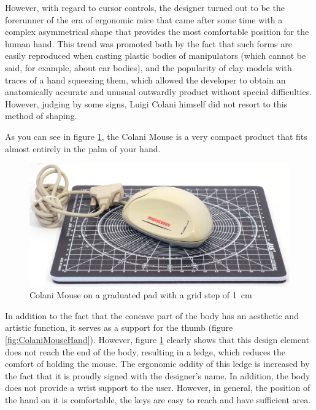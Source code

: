 \documentclass[11pt, a4paper]{article}
\begin{document}
However, with regard to cursor controls, the designer turned out to be the forerunner of the era of ergonomic mice that came after some time with a complex asymmetrical shape that provides the most comfortable position for the human hand. This trend was promoted both by the fact that such forms are easily reproduced when casting plastic bodies of manipulators (which cannot be said, for example, about car bodies), and the popularity of clay models with traces of a hand squeezing them, which allowed the developer to obtain an anatomically accurate and unusual outwardly product without special difficulties. However, judging by some signs, Luigi Colani himself did not resort to this method of shaping.

As you can see in figure \ref{fig:ColaniMouseSize}, the Colani Mouse is a very compact product that fits almost entirely in the palm of your hand.

\begin{figure}[h]
    \centering
    \includegraphics[scale=0.5]{1993_colani_mouse/size_30.jpg}
    \caption{Colani Mouse on a graduated pad with a grid step of 1~cm}
    \label{fig:ColaniMouseSize}
\end{figure}

In addition to the fact that the concave part of the body has an aesthetic and artistic function, it serves as a support for the thumb (figure \ref{fig:ColaniMouseHand}). However, figure \ref{fig:ColaniMouseSize} clearly shows that this design element does not reach the end of the body, resulting in a ledge, which reduces the comfort of holding the mouse. The ergonomic oddity of this ledge is increased by the fact that it is proudly signed with the designer's name. In addition, the body does not provide a wrist support to the user. However, in general, the position of the hand on it is comfortable, the keys are easy to reach and have sufficient area.
\end{document}
